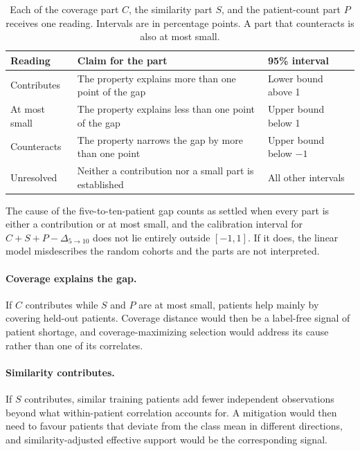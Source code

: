 \documentclass[11pt]{article}
\begin{document}
\begin{table}[htbp]
\centering
\renewcommand{\arraystretch}{1.15}
\begin{tabularx}{\textwidth}{@{}lYl@{}}
\toprule
Reading & Claim for the part & 95\% interval \\
\midrule
Contributes & The property explains more than one point of the gap & Lower bound above 1 \\
\addlinespace
At most small & The property explains less than one point of the gap & Upper bound below 1 \\
\addlinespace
Counteracts & The property narrows the gap by more than one point & Upper bound below $-1$ \\
\addlinespace
Unresolved & Neither a contribution nor a small part is established & All other intervals \\
\bottomrule
\end{tabularx}
\caption{Each of the coverage part $C$, the similarity part $S$, and the patient-count part $P$ receives one reading. Intervals are in percentage points. A part that counteracts is also at most small.}
\label{tab:readings}
\end{table}

\noindent The cause of the five-to-ten-patient gap counts as settled when every part is either a contribution or at most small, and the calibration interval for $C+S+P-\Delta_{5\to10}$ does not lie entirely outside $[-1,1]$. If it does, the linear model misdescribes the random cohorts and the parts are not interpreted.

\paragraph{Coverage explains the gap.}
If $C$ contributes while $S$ and $P$ are at most small, patients help mainly by covering held-out patients. Coverage distance would then be a label-free signal of patient shortage, and coverage-maximizing selection would address its cause rather than one of its correlates.

\paragraph{Similarity contributes.}
If $S$ contributes, similar training patients add fewer independent observations beyond what within-patient correlation accounts for. A mitigation would then need to favour patients that deviate from the class mean in different directions, and similarity-adjusted effective support would be the corresponding signal.
\end{document}
